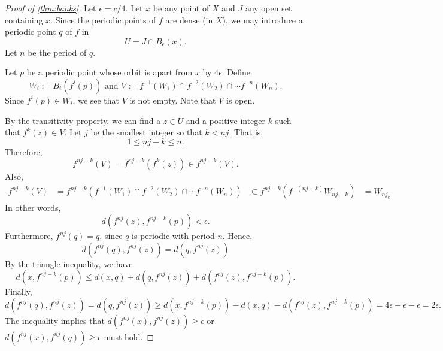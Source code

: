 \documentclass[12pt,draft,twoside]{book}
\begin{document}
\begin{proof}[Proof of \ref{thm:banks}]
  Let $\epsilon = c/4$. Let $x$ be any point of $X$ and $J$ any open set containing $x$.
  Since the periodic points of $f$ are dense (in $X$), we may introduce a periodic point
  $q$ of $f$ in
  \begin{equation*}
    U = J\cap B_\epsilon(x).
  \end{equation*}
  Let $n$ be the period of $q$.
  
  Let $p$ be a periodic point whose orbit is apart from $x$ by $4\epsilon$. Define
  \begin{equation*}
    W_i := B_i(f^i(p)) \text{ and } V := f^{-1}(W_1) \cap f^{-2}(W_2) \cap \cdots f^{-n}(W_n).
  \end{equation*}
  Since $f^i(p) \in W_i$, we see that $V$ is not empty. Note that $V$ is open.

  By the transitivity property, we can find a $z\in U$ and a positive integer $k$ such that
  $f^k(z) \in V$. Let $j$ be the smallest integer so that $k < nj$. That is,
  \begin{equation*}
    1 \leq nj - k \leq n.
  \end{equation*}
  Therefore,
  \begin{equation*}
    f^{nj - k} (V) = f^{nj - k} (f^k(z)) \in f^{nj-k}(V).
  \end{equation*}
  Also,
  \begin{align*}
     f^{nj - k}(V) &= f^{nj - k} (f^{-1}(W_1) \cap f^{-2}(W_2) \cap \cdots f^{-n}(W_n))
     &\subset f^{nj - k}(f^{-(nj - k)} W_{nj-k})
     &= W_{nj_k}
  \end{align*}
  In other words,
  \begin{equation*}
    d(f^{nj}(z), f^{nj - k}(p)) < \epsilon.
  \end{equation*}
  Furthermore, $f^{nj}(q) = q$, since $q$ is periodic with period $n$. Hence, 
  \begin{equation*}
    d(f^{nj}(q), f^{nj}(z)) = d(q, f^{nj}(z)) 
  \end{equation*}
  By the triangle inequality, we have
  \begin{equation*}
    d(x, f^{nj-k}(p)) \leq d(x,q) + d(q, f^{nj}(z)) + d(f^{nj}(z), f^{nj - k}(p)).
  \end{equation*}
  Finally, 
  \begin{equation*}
    d(f^{nj}(q), f^{nj}(z)) = d(q, f^{nj}(z)) \geq  d(x, f^{nj-k}(p)) - d(x,q) - d(f^{nj}(z), f^{nj - k}(p)) = 4\epsilon - \epsilon - \epsilon = 2\epsilon.
  \end{equation*}
  The inequality implies that $d(f^{nj}(x), f^{nj}(z)) \geq \epsilon$ or $d(f^{nj}(x), f^{nj}(q)) \geq \epsilon$ must hold.

\end{proof}
\end{document}
